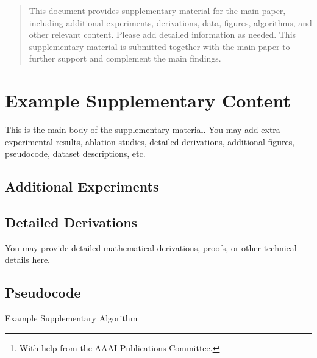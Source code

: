 \documentclass[letterpaper]{article} %
\author{
    Written by AAAI Press Staff\textsuperscript{\rm 1}\thanks{With help from the AAAI Publications Committee.}\\
    AAAI Style Contributions by Pater Patel Schneider,
    Sunil Issar,\\
    J. Scott Penberthy,
    George Ferguson,
    Hans Guesgen,
    Francisco Cruz\equalcontrib,
    Marc Pujol-Gonzalez\equalcontrib}
\begin{document}
\maketitle
\begin{abstract}
This document provides supplementary material for the main paper, including additional experiments, derivations, data, figures, algorithms, and other relevant content. Please add detailed information as needed. This supplementary material is submitted together with the main paper to further support and complement the main findings.
\end{abstract}


\section{Example Supplementary Content}

This is the main body of the supplementary material. You may add extra experimental results, ablation studies, detailed derivations, additional figures, pseudocode, dataset descriptions, etc.

\subsection{Additional Experiments}


\subsection{Detailed Derivations}

You may provide detailed mathematical derivations, proofs, or other technical details here.

\subsection{Pseudocode}

\begin{algorithm}[h]
\caption{Example Supplementary Algorithm}
\begin{algorithmic}[1]
\ENDFOR%
\end{algorithmic}
\end{algorithm}



\end{document}
